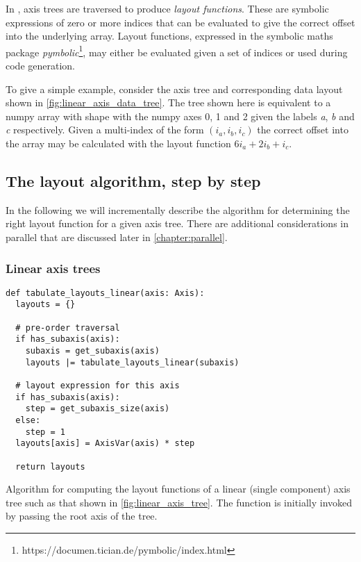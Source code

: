 \documentclass[thesis]{subfiles}
\begin{document}
In , axis trees are traversed to produce \textit{layout functions}.
These are symbolic expressions of zero or more indices that can be evaluated to give the correct offset into the underlying array.
Layout functions, expressed in the symbolic maths package \textit{pymbolic}\footnote{https://documen.tician.de/pymbolic/index.html}, may either be evaluated given a set of indices or used during code generation.

To give a simple example, consider the axis tree and corresponding data layout shown in \cref{fig:linear_axis_data_tree}.
The tree shown here is equivalent to a numpy array with shape  with the numpy axes 0, 1 and 2 given the labels \textit{a}, \textit{b} and \textit{c} respectively.
Given a multi-index of the form $(i_a, i_b, i_c)$ the correct offset into the array may be calculated with the layout function $6 i_a + 2 i_b + i_c$.

\subsection{The layout algorithm, step by step}

In the following we will incrementally describe the algorithm for determining the right layout function for a given axis tree.
There are additional considerations in parallel that are discussed later in \cref{chapter:parallel}.

\subsubsection{Linear axis trees}

\begin{algorithm}
  \begin{verbatim}
def tabulate_layouts_linear(axis: Axis):
  layouts = {}

  # pre-order traversal
  if has_subaxis(axis): 
    subaxis = get_subaxis(axis)
    layouts |= tabulate_layouts_linear(subaxis)

  # layout expression for this axis
  if has_subaxis(axis):
    step = get_subaxis_size(axis)
  else:
    step = 1
  layouts[axis] = AxisVar(axis) * step

  return layouts
  \end{verbatim}
  \caption{
    Algorithm for computing the layout functions of a linear (single component) axis tree such as that shown in \cref{fig:linear_axis_tree}.
    The function is initially invoked by passing the root axis of the tree.
  }
  \label{alg:tabulate_layouts_linear}
\end{algorithm}
\end{document}
